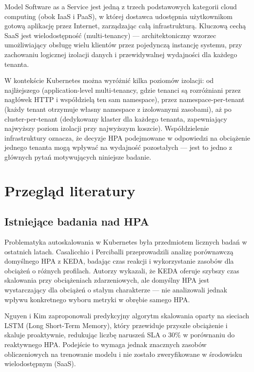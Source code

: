 Model Software as a Service jest jedną z trzech podstawowych kategorii cloud computing (obok IaaS i PaaS), w której dostawca udostępnia użytkownikom gotową aplikację przez Internet, zarządzając całą infrastrukturą. Kluczową cechą SaaS jest wielodostępność (multi-tenancy) --- architektoniczny wzorzec umożliwiający obsługę wielu klientów przez pojedynczą instancję systemu, przy zachowaniu logicznej izolacji danych i przewidywalnej wydajności dla każdego tenanta.

W kontekście Kubernetes można wyróżnić kilka poziomów izolacji: od najlżejszego (application-level multi-tenancy, gdzie tenanci są rozróżniani przez nagłówek HTTP i współdzielą ten sam namespace), przez namespace-per-tenant (każdy tenant otrzymuje własny namespace z izolowanymi zasobami), aż po cluster-per-tenant (dedykowany klaster dla każdego tenanta, zapewniający najwyższy poziom izolacji przy najwyższym koszcie). Współdzielenie infrastruktury oznacza, że decyzje HPA podejmowane w odpowiedzi na obciążenie jednego tenanta mogą wpływać na wydajność pozostałych --- jest to jedno z głównych pytań motywujących niniejsze badanie.

\section{Przegląd literatury}

\subsection{Istniejące badania nad HPA}

Problematyka autoskalowania w Kubernetes była przedmiotem licznych badań w ostatnich latach. Casalicchio i Perciballi \cite{huawei2021} przeprowadzili analizę porównawczą domyślnego HPA z KEDA, badając czas reakcji i wykorzystanie zasobów dla obciążeń o różnych profilach. Autorzy wykazali, że KEDA oferuje szybszy czas skalowania przy obciążeniach zdarzeniowych, ale domyślny HPA jest wystarczający dla obciążeń o stałym charakterze --- nie analizowali jednak wpływu konkretnego wyboru metryki w obrębie samego HPA.

Nguyen i Kim \cite{nguyen2020} zaproponowali predykcyjny algorytm skalowania oparty na sieciach LSTM (Long Short-Term Memory), który przewiduje przyszłe obciążenie i skaluje proaktywnie, redukując liczbę naruszeń SLA o 30\% w porównaniu do reaktywnego HPA. Podejście to wymaga jednak znacznych zasobów obliczeniowych na trenowanie modelu i nie zostało zweryfikowane w środowisku wielodostępnym (SaaS).

